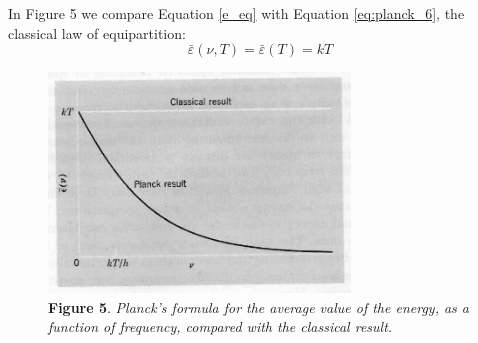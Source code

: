 In Figure 5 we compare Equation \eqref{e_eq} with Equation \eqref{eq:planck_6}, the classical law of
equipartition:
%
\begin{equation*}\tag{6}
\bar{\varepsilon}(\nu, T) = \bar{\varepsilon}(T) = kT %
\end{equation*}
%
%
\begin{figure}[h]
  \begin{center}
  \captionsetup{width=4.15625in}
  \includegraphics[width=3.15625in,height=2.30208in]{images/05_planck/image028.jpg}
  \caption*{\textbf{Figure 5}. \emph{Planck's formula for the average value of the energy,
    as a function of frequency, compared with the classical result.}}
  \end{center}
\end{figure}
%
